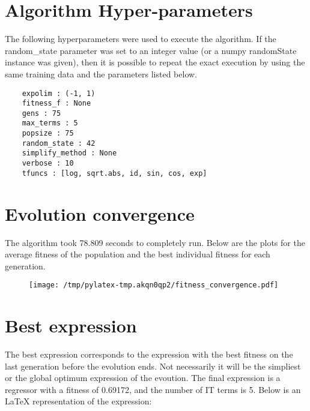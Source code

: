 \documentclass{article}%
\begin{document}
%
\vfill \pagebreak

%
\section*{Algorithm Hyper-parameters}%
\label{sec:AlgorithmHyper{-}parameters}%

                The following hyperparameters were used to execute the
                algorithm. If the random\_state parameter was set to an 
                integer value (or a numpy randomState instance was given), then
                it is possible to repeat the exact execution by using the same
                training data and the parameters listed below.%
{\footnotesize \begin{verbatim}    expolim : (-1, 1)
    fitness_f : None
    gens : 75
    max_terms : 5
    popsize : 75
    random_state : 42
    simplify_method : None
    verbose : 10
    tfuncs : [log, sqrt.abs, id, sin, cos, exp]\end{verbatim} } \vfill \pagebreak

%

            \chead{}
            \rhead{\today, \currenttime}
            
            \lfoot{}
            \cfoot{}
            \rfoot{\thepage\ | \pageref{LastPage}}
\section*{Evolution convergence}%
\label{sec:Evolutionconvergence}%

                The algorithm took 78.809 seconds to
                completely run. Below are the plots for the average fitness
                of the population and the best individual fitness for each
                generation.\vfill%


\begin{figure}[H]%
\centering%
\texttt{[image: /tmp/pylatex-tmp.akqn0qp2/fitness\_convergence.pdf]}%
\end{figure}

%
\vfill \pagebreak

%
\section*{Best expression}%
\label{sec:Bestexpression}%

                The best expression corresponds to the expression with
                the best fitness on the last generation before the evolution
                ends. Not necessarily it will be the simpliest or the global
                optimum expression of the evoution. The final expression is a regressor with a fitness of
                0.69172, and the number of IT terms is
                5. Below is an LaTeX representation
                of the expression:
                
\end{document}
